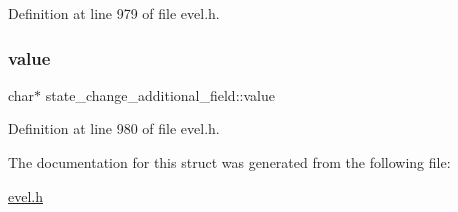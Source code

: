 Definition at line 979 of file evel.\+h.

\hypertarget{structstate__change__additional__field_a13d1bd59f934124cf2a95a3851f17929}{}\label{structstate__change__additional__field_a13d1bd59f934124cf2a95a3851f17929} 
\subsubsection{\texorpdfstring{value}{value}}
{\footnotesize\ttfamily char$\ast$ state\+\_\+change\+\_\+additional\+\_\+field\+::value}



Definition at line 980 of file evel.\+h.



The documentation for this struct was generated from the following file\+:\begin{DoxyCompactItemize}
\item 
\hyperlink{evel_8h}{evel.\+h}\end{DoxyCompactItemize}
